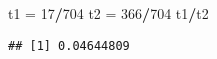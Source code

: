 \documentclass[
]{article}
\newenvironment{Shaded}{\begin{snugshade}}{\end{snugshade}}
\newcommand{\DecValTok}[1]{\textcolor[rgb]{0.00,0.00,0.81}{#1}}
\newcommand{\KeywordTok}[1]{\textcolor[rgb]{0.13,0.29,0.53}{\textbf{#1}}}
\newcommand{\NormalTok}[1]{#1}
\newcommand{\OperatorTok}[1]{\textcolor[rgb]{0.81,0.36,0.00}{\textbf{#1}}}
\newcommand{\StringTok}[1]{\textcolor[rgb]{0.31,0.60,0.02}{#1}}
\begin{document}
\begin{Shaded}
\begin{Highlighting}[]
\NormalTok{t1 =}\StringTok{ }\DecValTok{17}\OperatorTok{/}\DecValTok{704}
\NormalTok{t2 =}\StringTok{ }\DecValTok{366}\OperatorTok{/}\DecValTok{704}
\NormalTok{t1}\OperatorTok{/}\NormalTok{t2}
\end{Highlighting}
\end{Shaded}

\begin{verbatim}
## [1] 0.04644809
\end{verbatim}

\begin{Shaded}
\end{Shaded}
\end{document}
